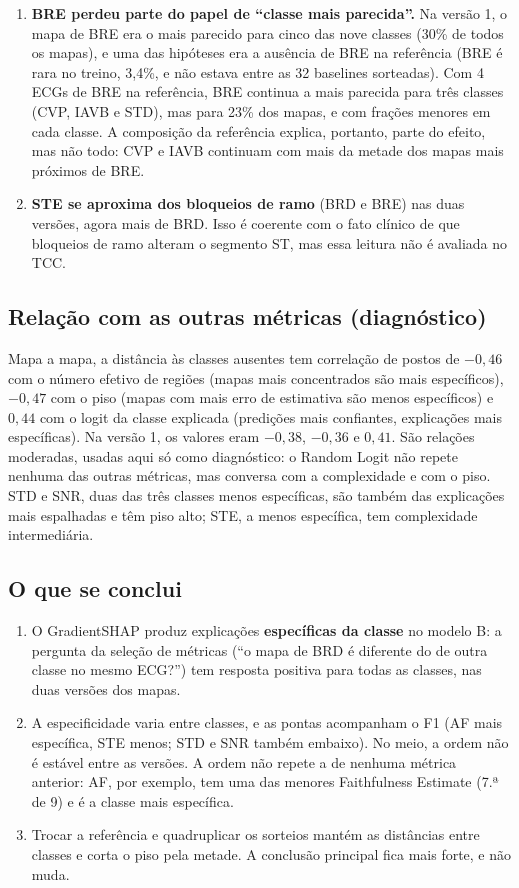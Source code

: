 \documentclass[11pt,a4paper]{article}
\begin{document}
\begin{enumerate}[label=(\roman*)]
\item \textbf{BRE perdeu parte do papel de “classe mais parecida”.} Na versão 1, o mapa de BRE era o mais parecido para cinco das nove classes (30\% de todos os mapas), e uma das hipóteses era a ausência de BRE na referência (BRE é rara no treino, 3,4\%, e não estava entre as 32 baselines sorteadas). Com 4 ECGs de BRE na referência, BRE continua a mais parecida para três classes (CVP, IAVB e STD), mas para 23\% dos mapas, e com frações menores em cada classe. A composição da referência explica, portanto, parte do efeito, mas não todo: CVP e IAVB continuam com mais da metade dos mapas mais próximos de BRE.
\item \textbf{STE se aproxima dos bloqueios de ramo} (BRD e BRE) nas duas versões, agora mais de BRD. Isso é coerente com o fato clínico de que bloqueios de ramo alteram o segmento ST, mas essa leitura não é avaliada no TCC.
\end{enumerate}

\subsection{Relação com as outras métricas (diagnóstico)}
Mapa a mapa, a distância às classes ausentes tem correlação de postos de $-0{,}46$ com o número efetivo de regiões (mapas mais concentrados são mais específicos), $-0{,}47$ com o piso (mapas com mais erro de estimativa são menos específicos) e $0{,}44$ com o logit da classe explicada (predições mais confiantes, explicações mais específicas). Na versão 1, os valores eram $-0{,}38$, $-0{,}36$ e $0{,}41$. São relações moderadas, usadas aqui só como diagnóstico: o Random Logit não repete nenhuma das outras métricas, mas conversa com a complexidade e com o piso. STD e SNR, duas das três classes menos específicas, são também das explicações mais espalhadas e têm piso alto; STE, a menos específica, tem complexidade intermediária.

\subsection{O que se conclui}
\begin{enumerate}
\item O GradientSHAP produz explicações \textbf{específicas da classe} no modelo B: a pergunta da seleção de métricas (“o mapa de BRD é diferente do de outra classe no mesmo ECG?”) tem resposta positiva para todas as classes, nas duas versões dos mapas.
\item A especificidade varia entre classes, e as pontas acompanham o F1 (AF mais específica, STE menos; STD e SNR também embaixo). No meio, a ordem não é estável entre as versões. A ordem não repete a de nenhuma métrica anterior: AF, por exemplo, tem uma das menores Faithfulness Estimate (7.ª de 9) e é a classe mais específica.
\item Trocar a referência e quadruplicar os sorteios mantém as distâncias entre classes e corta o piso pela metade. A conclusão principal fica mais forte, e não muda.
\end{enumerate}
\end{document}
